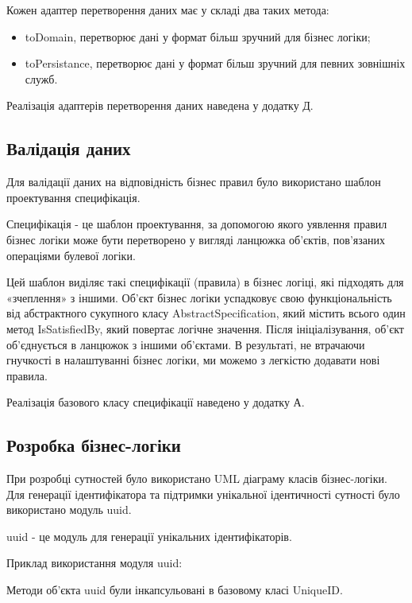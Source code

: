 Кожен адаптер перетворення даних має у складі два таких метода:

\begin{itemize}
    \item toDomain, перетворює дані у формат більш зручний для бізнес логіки;
    \item toPersistance, перетворює дані у формат більш зручний для певних зовнішніх служб.
\end{itemize}

Реалізація адаптерів перетворення даних наведена у додатку Д.

\subsection{Валідація даних}

Для валідації даних на відповідність бізнес правил було використано
шаблон проектування специфікація.

Специфікація - це шаблон проектування, за допомогою якого
уявлення правил бізнес логіки може бути перетворено у вигляді
ланцюжка об'єктів, пов'язаних операціями булевої логіки.

Цей шаблон виділяє такі специфікації (правила) в бізнес логіці,
які підходять для «зчеплення» з іншими. Об'єкт бізнес логіки
успадковує свою функціональність від абстрактного сукупного
класу AbstractSpecification, який містить всього один метод IsSatisfiedBy,
який повертає логічне значення. Після ініціалізування, об'єкт об'єднується
в ланцюжок з іншими об'єктами. В результаті, не втрачаючи гнучкості
в налаштуванні бізнес логіки, ми можемо з легкістю додавати нові правила.

Реалізація базового класу специфікації наведено у додатку А.

\subsection{Розробка бізнес-логіки}

При розробці сутностей було використано UML діаграму класів бізнес-логіки.
Для генерації ідентифікатора та підтримки унікальної ідентичності 
сутності було використано модуль uuid.

uuid - це модуль для генерації унікальних ідентифікаторів.

Приклад використання модуля uuid:


Методи об'єкта uuid були інкапсульовані в базовому класі UniqueID.

